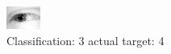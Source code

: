 \begin{figure}[h!]
\begin{center}
\includegraphics[width=0.60\columnwidth]{figures/ID2507_class_3_target_4.png}
\end{center}
\caption{ Classification: 3 actual target: 4}
\label{fig:ID2507_class_3_target_4}
\end{figure}
